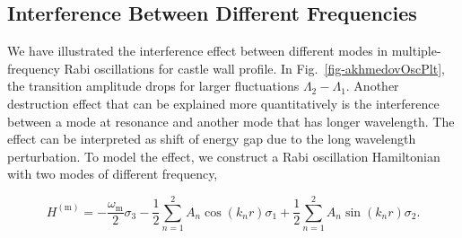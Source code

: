 \documentclass[%
reprint,
 amsmath,amssymb,
 aps,
]{revtex4-1}
\begin{document}



\subsection{\label{sec:interference-with-long-wavelength-mode}Interference Between Different Frequencies}



We have illustrated the interference effect between different modes in multiple-frequency Rabi oscillations for castle wall profile. In Fig.~\ref{fig-akhmedovOscPlt}, the transition amplitude drops for larger fluctuations $\Lambda_2-\Lambda_1$. Another destruction effect that can be explained more quantitatively is the interference between a mode at resonance and another mode that has longer wavelength. The effect can be interpreted as shift of energy gap due to the long wavelength perturbation. To model the effect, we construct a Rabi oscillation Hamiltonian with two modes of different frequency,
\begin{widetext}
\begin{equation}
H^{(\mathrm{m})}  = -\frac{\omega_{\mathrm{m}}}{2} \sigma_3 - \frac{1}{2} \sum_{n=1}^2  A_n \cos (k_n r) \sigma_1 + \frac{1}{2} \sum_{n=1}^2  A_n \sin (k_n r) \sigma_2 .
\label{eq-hamiltonian-rabi-two-modes-interference}
\end{equation}
\end{widetext}
\end{document}
